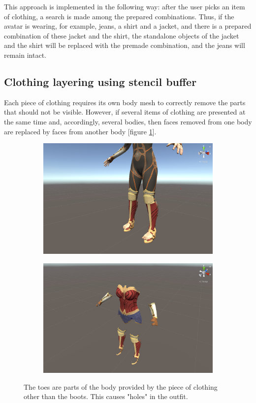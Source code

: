 \documentclass[a4paper]{report}
\begin{document}
This approach is implemented in the following way:  after the user picks an item of clothing, a search is made among the prepared combinations.
Thus, if the avatar is wearing, for example, jeans, a shirt and a jacket, and there is a prepared combination of these jacket and the shirt, the standalone objects of the jacket and the shirt will be replaced with the premade combination, and the jeans will remain intact.









\subsection{Clothing layering using stencil buffer}

\qquad Each piece of clothing requires its own body mesh to correctly remove the parts that should not be visible. However, if several items of clothing are presented at the same time and, accordingly, several bodies, then faces removed from one body are replaced by faces from another body [figure \ref{fig:stenc_1}].

\begin{figure}[H]
\centering
    \begin{subfigure}{\textwidth}
      \centering
      \includegraphics[width=.45\textwidth , keepaspectratio]{images/ClothesDemos/Screenshot 2021-05-08 215039.png}
    \end{subfigure}%
    \begin{subfigure}{\textwidth}
      \centering
      \includegraphics[width=.45\textwidth , keepaspectratio]{images/ClothesDemos/Screenshot 2021-05-08 221538.png}
    \end{subfigure}
\caption{The toes are parts of the body provided by the piece of clothing other than the boots. This causes "holes" in the outfit.}
\label{fig:stenc_1}
\end{figure}
\end{document}
